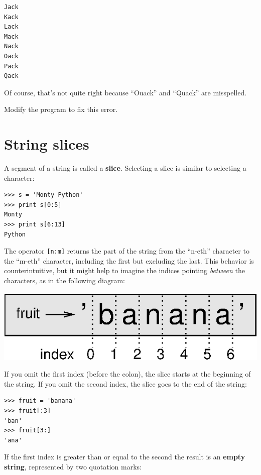\documentclass[10pt]{book}
\begin{document}
\beforeverb
\begin{verbatim}
Jack
Kack
Lack
Mack
Nack
Oack
Pack
Qack
\end{verbatim}
\afterverb
%
Of course, that's not quite right because ``Ouack'' and
``Quack'' are misspelled.

\begin{ex}
Modify the program to fix this error.
\end{ex}



\section{String slices}
\label{slice}


A segment of a string is called a {\bf slice}.  Selecting a slice is
similar to selecting a character:

\beforeverb
\begin{verbatim}
>>> s = 'Monty Python'
>>> print s[0:5]
Monty
>>> print s[6:13]
Python
\end{verbatim}
\afterverb
%
The operator {\tt [n:m]} returns the part of the string from the 
``n-eth'' character to the ``m-eth'' character, including the first but
excluding the last.  This behavior is counterintuitive, but it might
help to imagine the indices pointing {\em between} the
characters, as in the following diagram:

\beforefig
\centerline{\includegraphics{figs/banana.eps}}
\afterfig

If you omit the first index (before the colon), the slice starts at
the beginning of the string.  If you omit the second index, the slice
goes to the end of the string:

\beforeverb
\begin{verbatim}
>>> fruit = 'banana'
>>> fruit[:3]
'ban'
>>> fruit[3:]
'ana'
\end{verbatim}
\afterverb
%
If the first index is greater than or equal to the second the result
is an {\bf empty string}, represented by two quotation marks:
\end{document}
